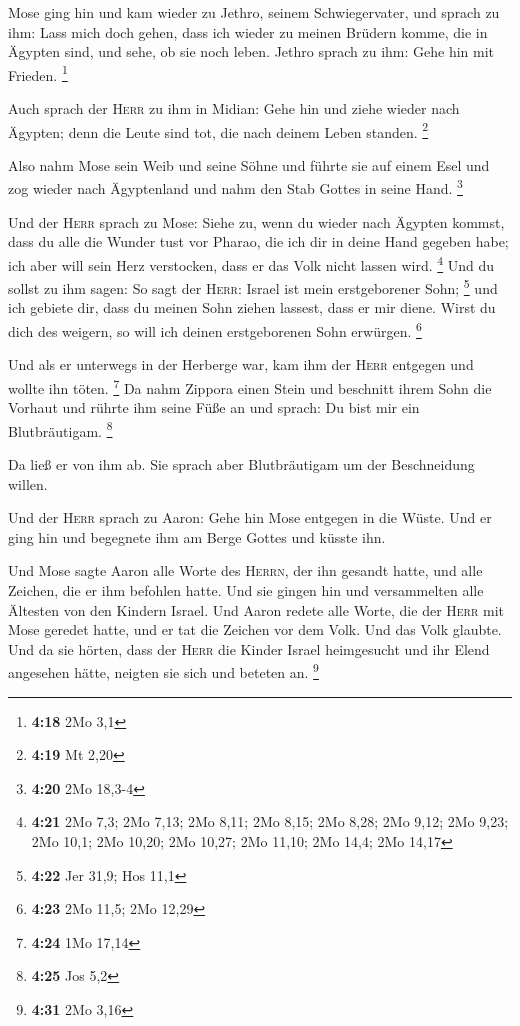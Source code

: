  Mose ging hin und kam wieder zu Jethro, seinem
Schwiegervater, und sprach zu ihm: Lass mich doch gehen, dass ich wieder
zu meinen Brüdern komme, die in Ägypten sind, und sehe, ob sie noch
leben. Jethro sprach zu ihm: Gehe hin mit Frieden. \footnote{\textbf{4:18}
  2Mo 3,1}

 Auch sprach der \textsc{Herr} zu ihm in Midian: Gehe hin
und ziehe wieder nach Ägypten; denn die Leute sind tot, die nach deinem
Leben standen. \footnote{\textbf{4:19} Mt 2,20}

 Also nahm Mose sein Weib und seine Söhne und führte sie
auf einem Esel und zog wieder nach Ägyptenland und nahm den Stab Gottes
in seine Hand. \footnote{\textbf{4:20} 2Mo 18,3-4}

 Und der \textsc{Herr} sprach zu Mose: Siehe zu, wenn du
wieder nach Ägypten kommst, dass du alle die Wunder tust vor Pharao, die
ich dir in deine Hand gegeben habe; ich aber will sein Herz verstocken,
dass er das Volk nicht lassen wird. \footnote{\textbf{4:21} 2Mo 7,3; 2Mo
  7,13; 2Mo 8,11; 2Mo 8,15; 2Mo 8,28; 2Mo 9,12; 2Mo 9,23; 2Mo 10,1; 2Mo
  10,20; 2Mo 10,27; 2Mo 11,10; 2Mo 14,4; 2Mo 14,17}  Und
du sollst zu ihm sagen: So sagt der \textsc{Herr}: Israel ist mein
erstgeborener Sohn; \footnote{\textbf{4:22} Jer 31,9; Hos 11,1}
 und ich gebiete dir, dass du meinen Sohn ziehen lassest,
dass er mir diene. Wirst du dich des weigern, so will ich deinen
erstgeborenen Sohn erwürgen. \footnote{\textbf{4:23} 2Mo 11,5; 2Mo 12,29}

 Und als er unterwegs in der Herberge war, kam ihm der
\textsc{Herr} entgegen und wollte ihn töten. \footnote{\textbf{4:24} 1Mo
  17,14}  Da nahm Zippora einen Stein und beschnitt ihrem
Sohn die Vorhaut und rührte ihm seine Füße an und sprach: Du bist mir
ein Blutbräutigam. \footnote{\textbf{4:25} Jos 5,2}

 Da ließ er von ihm ab. Sie sprach aber Blutbräutigam um
der Beschneidung willen.

 Und der \textsc{Herr} sprach zu Aaron: Gehe hin Mose
entgegen in die Wüste. Und er ging hin und begegnete ihm am Berge Gottes
und küsste ihn.

 Und Mose sagte Aaron alle Worte des \textsc{Herrn}, der
ihn gesandt hatte, und alle Zeichen, die er ihm befohlen hatte.
 Und sie gingen hin und versammelten alle Ältesten von
den Kindern Israel.  Und Aaron redete alle Worte, die der
\textsc{Herr} mit Mose geredet hatte, und er tat die Zeichen vor dem
Volk.  Und das Volk glaubte. Und da sie hörten, dass der
\textsc{Herr} die Kinder Israel heimgesucht und ihr Elend angesehen
hätte, neigten sie sich und beteten an. \footnote{\textbf{4:31} 2Mo 3,16}

